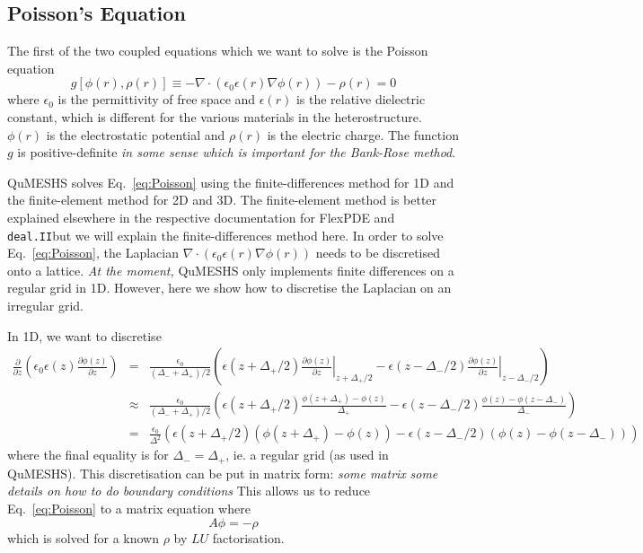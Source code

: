 \documentclass[12pt]{article}
\newcommand{\red}[1]{{\color{red} \it #1}}
\newcommand{\dealii}{\texttt{deal.II}}
\begin{document}
\subsection{Poisson's Equation}

The first of the two coupled equations which we want to solve is the Poisson equation
%
\begin{equation}
    \label{eq:Poisson}
    g \left[ \phi(r), \rho(r) \right] \equiv - \nabla \cdot \left(\epsilon_0 \epsilon(r) \nabla \phi(r)\right) - \rho(r) = 0
\end{equation}
%
where $\epsilon_0$ is the permittivity of free space and $\epsilon(r)$ is the relative
dielectric constant, which is different for the various materials in the heterostructure.
$\phi(r)$ is the electrostatic potential and $\rho(r)$ is the electric charge.   The
function $g$ is positive-definite \red{in some sense which is important for the Bank-Rose
method}.

QuMESHS solves Eq.~\ref{eq:Poisson} using the finite-differences method for 1D and
the finite-element method for 2D and 3D.  The finite-element method is better explained
elsewhere in the respective documentation for FlexPDE and \dealii but we will explain
the finite-differences method here.  In order to solve Eq.~\ref{eq:Poisson}, the
Laplacian $\nabla \cdot \left(\epsilon_0 \epsilon(r) \nabla \phi(r)\right)$ needs to
be discretised onto a lattice.  \red{At the moment,} QuMESHS only implements finite
differences on a regular grid in 1D.  However, here we show how to discretise the
Laplacian on an irregular grid.

In 1D, we want to discretise
%
\begin{eqnarray}
    \frac{\partial}{\partial z} \left( \epsilon_0 \epsilon(z) \frac{\partial \phi(z)}{\partial z} \right)
    & = & \frac{\epsilon_0}{(\Delta_- + \Delta_+) / 2} \left( \epsilon(z + \Delta_+ / 2) \left. \frac{\partial \phi(z)}{\partial z} \right|_{z + \Delta_+ / 2}
    - \epsilon(z - \Delta_- / 2) \left. \frac{\partial \phi(z)}{\partial z} \right|_{z - \Delta_- / 2} \right) \\
    & \approx & \frac{\epsilon_0}{(\Delta_- + \Delta_+) / 2} \left(\epsilon(z + \Delta_+ / 2) \frac{\phi(z + \Delta_+) - \phi(z)}{\Delta_+}
    - \epsilon(z - \Delta_- / 2) \frac{\phi(z) - \phi(z - \Delta_-)}{\Delta_-} \right) \\
    & = & \frac{\epsilon_0}{\Delta^2} \left(\epsilon(z + \Delta_+ / 2) \left(\phi(z + \Delta_+) - \phi(z)\right) -  \epsilon(z - \Delta_- / 2) \left(\phi(z) - \phi(z - \Delta_-)\right) \right)
\end{eqnarray}
%
where the final equality is for $\Delta_- = \Delta_+$, ie. a regular grid (as used in
QuMESHS).  This discretisation can be put in matrix form:
%
\red{some matrix}
%
\red{some details on how to do boundary conditions}
This allows us to reduce Eq.~\ref{eq:Poisson} to a matrix equation where
%
\begin{equation}
    A \phi = - \rho
\end{equation}
%
which is solved for a known $\rho$ by $LU$ factorisation.
\end{document}
